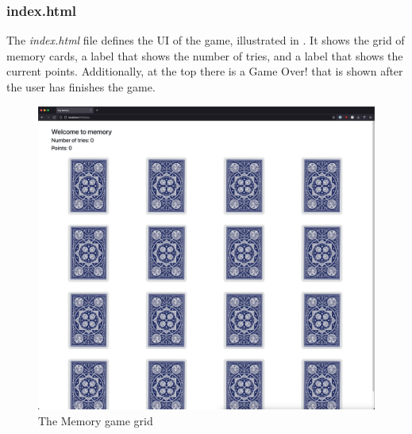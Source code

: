 \subsubsection{index.html}\label{subsubsec:03_impl_frontend_index}
The \textit{index.html} file defines the UI of the game, illustrated in . It shows the grid of memory cards, a label that shows the number of tries, and a label that shows the current points. Additionally, at the top there is a Game Over! that is shown after the user has finishes the game.
\begin{figure}[h]
\centering
\includegraphics[scale=0.2]{images/03_impl/frontend/grid}
\caption{The Memory game grid}
\label{fig:03_impl_frontend_index_grid}
\end{figure}

